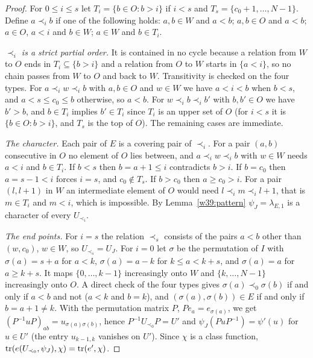 \begin{proof}
For $0\le i\le s$ let $T_i=\{b\in O:b>i\}$ if $i<s$ and $T_s=\{c_0+1,\dots,N-1\}$. Define $a\prec_ib$ if one of the following holds: $a,b\in W$ and $a<b$; $a,b\in O$ and $a<b$; $a\in O$, $a<i$ and $b\in W$; $a\in W$ and $b\in T_i$.

\emph{$\prec_i$ is a strict partial order.} It is contained in no cycle because a relation from $W$ to $O$ ends in $T_i\subseteq\{b>i\}$ and a relation from $O$ to $W$ starts in $\{a<i\}$, so no chain passes from $W$ to $O$ and back to $W$. Transitivity is checked on the four types. For $a\prec_iw\prec_ib$ with $a,b\in O$ and $w\in W$ we have $a<i<b$ when $b<s$, and $a<s\le c_0\le b$ otherwise, so $a<b$. For $w\prec_ib\prec_ib'$ with $b,b'\in O$ we have $b'>b$, and $b\in T_i$ implies $b'\in T_i$ since $T_i$ is an upper set of $O$ (for $i<s$ it is $\{b\in O:b>i\}$, and $T_s$ is the top of $O$). The remaining cases are immediate.

\emph{The character.} Each pair of $E$ is a covering pair of $\prec_i$. For a pair $(a,b)$ consecutive in $O$ no element of $O$ lies between, and $a\prec_iw\prec_ib$ with $w\in W$ needs $a<i$ and $b\in T_i$. If $b<s$ then $b=a+1\le i$ contradicts $b>i$. If $b=c_0$ then $a=s-1<i$ forces $i=s$, and $c_0\notin T_s$. If $b>c_0$ then $a\ge c_0>i$. For a pair $(l,l+1)$ in $W$ an intermediate element of $O$ would need $l\prec_im\prec_il+1$, that is $m\in T_i$ and $m<i$, which is impossible. By Lemma~\ref{w39:pattern} $\psi_J=\lambda_{E,1}$ is a character of every $U_{\prec_i}$.

\emph{The end points.} For $i=s$ the relation $\prec_s$ consists of the pairs $a<b$ other than $(w,c_0)$, $w\in W$, so $U_{\prec_s}=U_J$. For $i=0$ let $\sigma$ be the permutation of $I$ with $\sigma(a)=s+a$ for $a<k$, $\sigma(a)=a-k$ for $k\le a<k+s$, and $\sigma(a)=a$ for $a\ge k+s$. It maps $\{0,\dots,k-1\}$ increasingly onto $W$ and $\{k,\dots,N-1\}$ increasingly onto $O$. A direct check of the four types gives $\sigma(a)\prec_0\sigma(b)$ if and only if $a<b$ and not ($a<k$ and $b=k$), and $(\sigma(a),\sigma(b))\in E$ if and only if $b=a+1\ne k$. With the permutation matrix $P$, $Pe_a=e_{\sigma(a)}$, we get $(P^{-1}uP)_{ab}=u_{\sigma(a)\sigma(b)}$, hence $P^{-1}U_{\prec_0}P=U'$ and $\psi_J(PuP^{-1})=\psi'(u)$ for $u\in U'$ (the entry $u_{k-1,k}$ vanishes on $U'$). Since $\chi$ is a class function, $\operatorname{tr}(e(U_{\prec_0},\psi_J),\chi)=\operatorname{tr}(e',\chi)$.


\end{proof}
